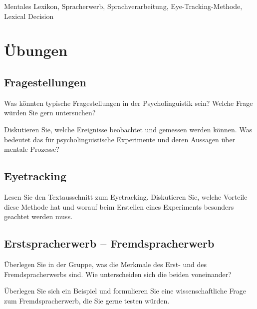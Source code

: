 \documentclass[11pt]{book}
\begin{document}
Mentales Lexikon, Spracherwerb, Sprachverarbeitung, Eye-Tracking-Methode, Lexical Decision

\newpage

\section{Übungen}



\subsection*{Fragestellungen}

Was könnten typische Fragestellungen in der Psycholinguistik sein? Welche Frage würden Sie gern untersuchen?

\vspace{4cm}

Diskutieren Sie, welche Ereignisse beobachtet und gemessen werden können. Was bedeutet das für psycholinguistische Experimente und deren Aussagen über mentale Prozesse?

\vspace{4cm}

\subsection*{Eyetracking}

Lesen Sie den Textausschnitt zum Eyetracking. Diskutieren Sie, welche Vorteile diese Methode hat und worauf beim Erstellen eines Experiments besonders geachtet werden muss.


\vspace{4cm}

\subsection*{Erstspracherwerb – Fremdspracherwerb}

Überlegen Sie in der Gruppe, was die Merkmale des Erst- und des Fremdspracherwerbs sind. Wie unterscheiden sich die beiden voneinander?

\vspace{4cm}

Überlegen Sie sich ein Beispiel und formulieren Sie eine wissenschaftliche Frage zum Fremdspracherwerb, die Sie gerne testen würden.

\vspace{4cm}

\newpage
\end{document}
